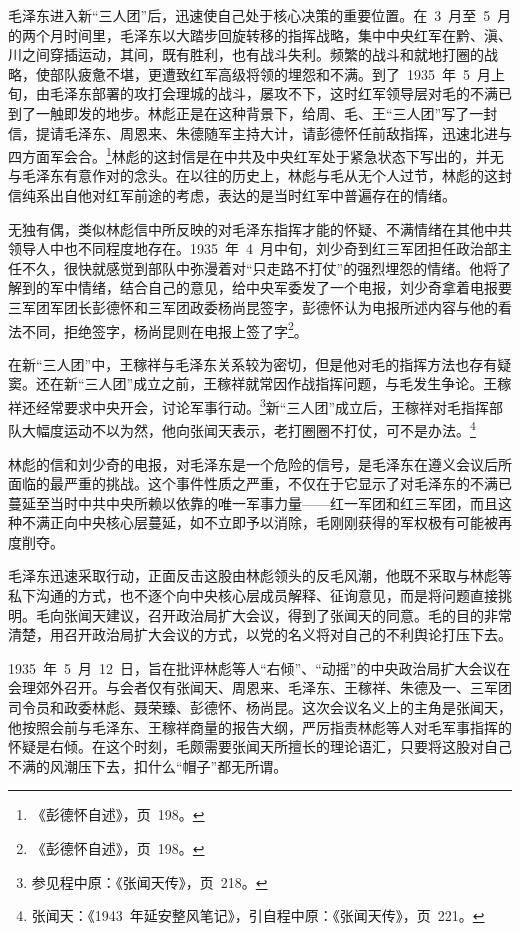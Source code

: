 毛泽东进入新“三人团”后，迅速使自己处于核心决策的重要位置。在~3~月至~5~月的两个月时间里，毛泽东以大踏步回旋转移的指挥战略，集中中央红军在黔、滇、川之间穿插运动，其间，既有胜利，也有战斗失利。频繁的战斗和就地打圈的战略，使部队疲惫不堪，更遭致红军高级将领的埋怨和不满。到了~1935~年~5~月上旬，由毛泽东部署的攻打会理城的战斗，屡攻不下，这时红军领导层对毛的不满已到了一触即发的地步。林彪正是在这种背景下，给周、毛、王“三人团”写了一封信，提请毛泽东、周恩来、朱德随军主持大计，请彭德怀任前敌指挥，迅速北进与四方面军会合。\footnote{《彭德怀自述》，页~198。}林彪的这封信是在中共及中央红军处于紧急状态下写出的，并无与毛泽东有意作对的念头。在以往的历史上，林彪与毛从无个人过节，林彪的这封信纯系出自他对红军前途的考虑，表达的是当时红军中普遍存在的情绪。

无独有偶，类似林彪信中所反映的对毛泽东指挥才能的怀疑、不满情绪在其他中共领导人中也不同程度地存在。1935~年~4~月中旬，刘少奇到红三军团担任政治部主任不久，很快就感觉到部队中弥漫着对“只走路不打仗”的强烈埋怨的情绪。他将了解到的军中情绪，结合自己的意见，给中央军委发了一个电报，刘少奇拿着电报要三军团军团长彭德怀和三军团政委杨尚昆签字，彭德怀认为电报所述内容与他的看法不同，拒绝签字，杨尚昆则在电报上签了字\footnote{《彭德怀自述》，页~198。}。

在新“三人团”中，王稼祥与毛泽东关系较为密切，但是他对毛的指挥方法也存有疑窦。还在新“三人团”成立之前，王稼祥就常因作战指挥问题，与毛发生争论。王稼祥还经常要求中央开会，讨论军事行动。\footnote{参见程中原：《张闻天传》，页~218。}新“三人团”成立后，王稼祥对毛指挥部队大幅度运动不以为然，他向张闻天表示，老打圈圈不打仗，可不是办法。\footnote{张闻天：《1943~年延安整风笔记》，引自程中原：《张闻天传》，页~221。}

林彪的信和刘少奇的电报，对毛泽东是一个危险的信号，是毛泽东在遵义会议后所面临的最严重的挑战。这个事件性质之严重，不仅在于它显示了对毛泽东的不满已蔓延至当时中共中央所赖以依靠的唯一军事力量——红一军团和红三军团，而且这种不满正向中央核心层蔓延，如不立即予以消除，毛刚刚获得的军权极有可能被再度削夺。

毛泽东迅速采取行动，正面反击这股由林彪领头的反毛风潮，他既不采取与林彪等私下沟通的方式，也不逐个向中央核心层成员解释、征询意见，而是将问题直接挑明。毛向张闻天建议，召开政治局扩大会议，得到了张闻天的同意。毛的目的非常清楚，用召开政治局扩大会议的方式，以党的名义将对自己的不利舆论打压下去。

1935~年~5~月~12~日，旨在批评林彪等人“右倾”、“动摇”的中央政治局扩大会议在会理郊外召开。与会者仅有张闻天、周恩来、毛泽东、王稼祥、朱德及一、三军团司令员和政委林彪、聂荣臻、彭德怀、杨尚昆。这次会议名义上的主角是张闻天，他按照会前与毛泽东、王稼祥商量的报告大纲，严厉指责林彪等人对毛军事指挥的怀疑是右倾。在这个时刻，毛颇需要张闻天所擅长的理论语汇，只要将这股对自己不满的风潮压下去，扣什么“帽子”都无所谓。

